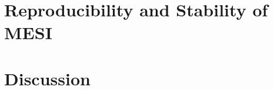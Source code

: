 \blindtext



\section{Reproducibility and Stability of MESI}

\blindtext



\section{Discussion}

\blindtext



